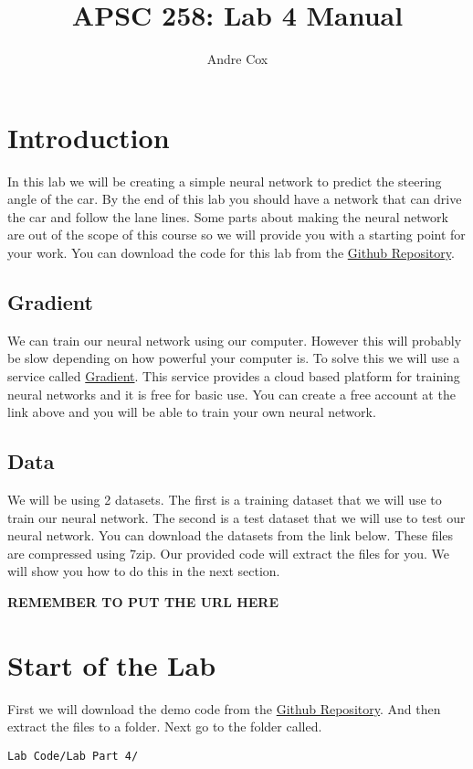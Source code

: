 \documentclass[11pt]{report}
\title{APSC 258: Lab 4 Manual}
\author{Andre Cox}
\begin{document}
\maketitle
\tableofcontents

\clearpage

\chapter{Introduction}
In this lab we will be creating a simple neural network to predict the steering angle of the car.
By the end of this lab you should have a network that can drive the car and follow the lane lines. Some parts about making the neural network are out of the scope of this course so we will provide you with a starting point for your work. You can download the code for this lab from the  
\href{https://github.com/PiCarV/Demos}{Github Repository}.

\section{Gradient}
We can train our neural network using our computer. However this will probably be slow depending on how powerful your computer is. To solve this we will use a service called \href{https://www.gradient.run/}{Gradient}. This service provides a cloud based platform for training neural networks and it is free for basic use. You can create a free account at the link above and you will be able to train your own neural network.

\section{Data}
We will be using 2 datasets. The first is a training dataset that we will use to train our neural network. The second is a test dataset that we will use to test our neural network. You can download the datasets from the link below. These files are compressed using 7zip. Our provided code will extract the files for you. We will show you how to do this in the next section.

\textbf{REMEMBER TO PUT THE URL HERE}

\pagebreak

\chapter{Start of the Lab}
First we will download the demo code from the \href{https://github.com/PiCarV/Demos/archive/refs/heads/main.zip}{Github Repository}. And then extract the files to a folder. Next go to the folder called.
\begin{verbatim} 
Lab Code/Lab Part 4/
\end{verbatim}
\end{document}
